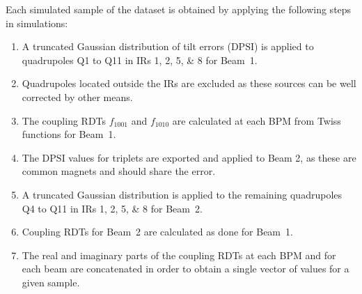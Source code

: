 

Each simulated sample of the dataset is obtained by applying the following steps in simulations:
\begin{enumerate}
    \item A truncated Gaussian distribution of tilt errors (\(\mathrm{DPSI}\)) is applied to quadrupoles Q\num{1} to Q\num{11} in IRs \numlist{1;2;5;8} for Beam~\num{1}.
    \item Quadrupoles located outside the IRs are excluded as these sources can be well corrected by other means.
    \item The coupling RDTs \(f_{1001}\) and \(f_{1010}\) are calculated at each BPM from Twiss functions for Beam~\num{1}.
    \item The \(\mathrm{DPSI}\) values for triplets are exported and applied to Beam 2, as these are common magnets and should share the error.
    \item A truncated Gaussian distribution is applied to the remaining quadrupoles Q\num{4} to Q\num{11} in IRs \numlist{1;2;5;8} for Beam~\num{2}.
    \item Coupling RDTs for Beam~\num{2} are calculated as done for Beam~\num{1}.
    \item The real and imaginary parts of the coupling RDTs at each BPM and for each beam are concatenated in order to obtain a single vector of values for a given sample.
\end{enumerate}

